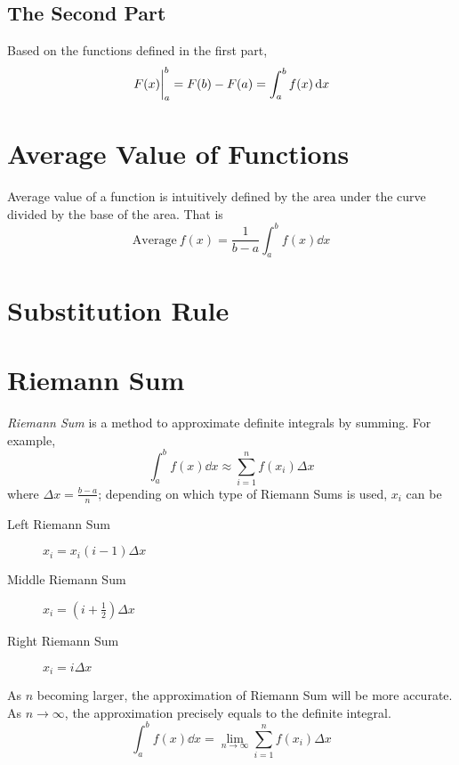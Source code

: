 \documentclass{note}
\begin{document}
\subsection{The Second Part}

Based on the functions defined in the first part, 
\begin{equation*}
    \eval{F(x)}_a^b = F(b) - F(a) = \int_a^b f(x) \dd{x}
\end{equation*}

\section{Average Value of Functions}

Average value of a function is intuitively defined by the area under the curve divided by the base of the area. That is
\begin{equation*}
    \mathrm{Average}\ f(x) = \frac{1}{b-a} \int_a^b f(x) \dd{x}
\end{equation*}

\section{Substitution Rule}
\section{Riemann Sum}

\textit{Riemann Sum} is a method to approximate definite integrals by summing. For example, 
\begin{equation*}
    \int_a^b f(x) \dd{x} \approx \sum^{n}_{i=1} f(x_i) \Delta x
\end{equation*}
where $\Delta x = \frac{b-a}{n}$; depending on which type of Riemann Sums is used, $x_i$ can be
\begin{description}
    \item[Left Riemann Sum] $x_i = x_i(i-1) \Delta x$
    \item[Middle Riemann Sum] $x_i = (i+\frac{1}{2}) \Delta x$
    \item[Right Riemann Sum] $x_i = i \Delta x$
\end{description}

As $n$ becoming larger, the approximation of Riemann Sum will be more accurate. As $n \to \infty$, the approximation precisely equals to the definite integral. 
\begin{equation*}
    \int_a^b f(x) \dd{x} = \lim_{n \to \infty} \sum^{n}_{i=1} f(x_i) \Delta x
\end{equation*}
\end{document}
